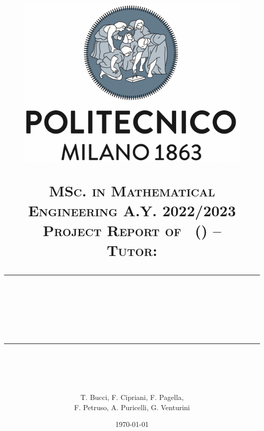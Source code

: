 \documentclass{article}
\title{
    \begin{figure}[htpb]
        \centering
        \includegraphics[scale=0.2]{images/logo-polimi}
    \end{figure}
    \normalfont \normalsize 
    \textsc{MSc. in Mathematical Engineering A.Y. 2022/2023\\ 
    Project Report of \coursename\ (\coursecode) -- \courseprof \\
    Tutor: \coursetutor} \\
    [10pt] 
    \rule{\linewidth}{0.5pt} \\ [6pt] 
    \huge \papertitle \\
    \rule{\linewidth}{2pt}  \\ [10pt]
}
\author{T. Bucci, F. Cipriani, F. Pagella,\\ F. Petruso, A. Puricelli, G. Venturini}
\date{\normalsize \today}
\begin{document}
\maketitle

\begin{abstract}
    \lipsum
\end{abstract}

\setlength{\columnsep}{0.8cm}
\begin{multicols}{2}
    
\end{multicols}


\printbibliography
\end{document}
